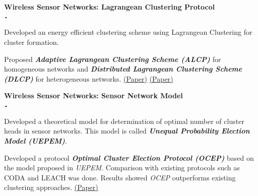 \documentclass{article}
\newcommand{\sbt}{\,\begin{picture}(-1,1)(-1,-3)\circle*{2}\end{picture}\ }
\newcommand{\project}[2]{{ \textbf{#1} \hfill #2\\  }}
\newenvironment{achievements}{\begin{list}{$\sbt$}{\topsep -2pt \itemsep -2pt}}{\vspace*{0pt}\end{list}}
\begin{document}
\project{Wireless Sensor Networks: Lagrangean Clustering Protocol}{}
	\begin{achievements}
	\item Developed an energy efficient clustering scheme using Lagrangean Clustering for cluster formation.  
	\item Proposed {\bf{\emph{Adaptive Lagrangean Clustering Scheme (ALCP)}}} for homogeneous networks and {\bf{\emph {Distributed Lagrangean Clustering Scheme (DLCP)}}} for heterogeneous networks.\newline
	\href{http://ieeexplore.ieee.org/stamp/stamp.jsp?arnumber=6449798}{(Paper)} \href{http://www.academia.edu/2320068/Distributed_Lagrangean_Clustering_Protocol_for_heterogeneous_sensor_networks}{(Paper)}
	\end{achievements}
\vspace{2mm}		

\project{Wireless Sensor Networks: Sensor Network Model}{}
	\begin{achievements}
	\item  Developed a theoretical model for determination of optimal number of cluster heads in sensor networks. This model is called {\bf{\emph{Unequal Probability Election Model (UEPEM)}}}. 
	\item  Developed a protocol {\bf{\emph{Optimal Cluster Election Protocol (OCEP)}}} based on the model proposed in \textit{UEPEM}. Comparison with existing protocols such as CODA and LEACH was done. Results showed \textit{OCEP} outperforms existing clustering approaches.
	\href{http://arxiv.org/pdf/1208.1982.pdf}{(Paper)}
	\end{achievements}
\vspace{3mm}	
\newpage
\end{document}
